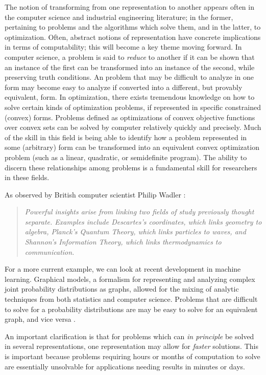 \bigskip

The notion of transforming from one representation to another appears often in the computer science and industrial engineering literature; in the former, pertaining to problems and the algorithms which solve them, and in the latter, to optimization.
Often, abstract notions of representation have concrete implications in terms of computability; this will become a key theme moving forward.
In computer science, a problem is said to \textit{reduce} to another if it can be shown that an instance of the first can be transformed into an instance of the second, while preserving truth conditions.
An problem that may be difficult to analyze in one form may become easy to analyze if converted into a different, but provably equivalent, form.
In optimization, there exists tremendous knowledge on how to solve certain kinds of optimization problems, if represented in specific constrained (convex) forms.
Problems defined as optimizations of convex objective functions over convex sets can be solved by computer relatively quickly and precisely.
Much of the skill in this field is being able to identify how a problem represented in some (arbitrary) form can be transformed into an equivalent convex optimization problem (such as a linear, quadratic, or semidefinite program).
The ability to discern these relationships among problems is a fundamental skill for researchers in these fields.

\bigskip

As observed by British computer scientist Philip Wadler \cite{wadler}: 

\begin{quotation}
\textit{
	Powerful insights arise from linking two fields of study previously thought separate.
	Examples include Descartes's coordinates, which links geometry to algebra, Planck's Quantum Theory, which links particles to waves, and Shannon's Information Theory, which links thermodynamics to communication.
	}
\end{quotation}

For a more current example, we can look at recent development in machine learning.
Graphical models, a formalism for representing and analyzing complex joint probability distributions as graphs, allowed for the mixing of analytic techniques from both statistics and computer science.
Problems that are difficult to solve for a probability distributions are may be easy to solve for an equivalent graph, and vice versa \cite{wainwright}.

An important clarification is that for problems which can \textit{in principle} be solved in several representations, one representation may allow for \textit{faster} solutions.
This is important because problems requiring hours or months of computation to solve are essentially unsolvable for applications needing results in minutes or days.

